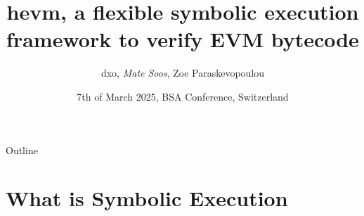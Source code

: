 \documentclass[aspectratio=169]{beamer}
\title[hevm]{
hevm, a flexible symbolic execution framework to verify EVM bytecode}
\author[dxo, Soos, Paraskevopoulou]{dxo, \emph{Mate Soos}, Zoe Paraskevopoulou}
\institute[Argot]{\large Argot Collective (\url{https://argot.org})}
\date{7th of March 2025, BSA Conference, Switzerland}
\begin{document}
\begin{frame}
    \titlepage 
\end{frame}

%

\begin{frame}{Outline}
    \tableofcontents
\end{frame}

\section{What is Symbolic Execution}


\end{document}
